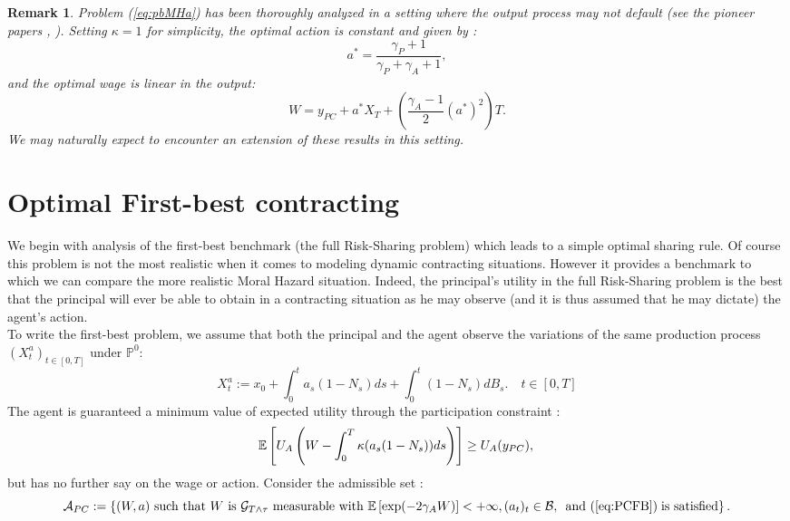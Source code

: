 \documentclass[numbook, envcountsect, envcountsame, envcountreset, runningheads, smallextended]{article}
\newtheorem{Remark}{Remark}[part]
\def \E{\mathbb{E}}
\def \P{\mathbb{P}}
\def\Bc{{\cal B}}
\begin{document}
\begin{Remark}
\label{rem:stand}
Problem (\ref{eq:pbMHa}) has been thoroughly analyzed in a setting where the output process may not default (see the pioneer papers \cite{HM}, \cite{SS} ). Setting $\kappa=1$ for simplicity,  the optimal action is  constant and given by :
$$a^* =  \frac{\gamma_P+1}{\gamma_P+\gamma_A+1},$$
and the optimal wage is linear in the output:
$$W = y_{PC} + a^* X_T+  \left( \frac{\gamma_A-1}{2} ({a^*})^2  \right)T.$$
 We may naturally expect to encounter an extension of these results in this setting.
 \end{Remark}

\section{Optimal First-best contracting}
\label{FB}

We begin with analysis of the first-best benchmark (the  full Risk-Sharing problem) which leads to a simple optimal sharing rule. Of course this problem is not the most realistic when it comes to modeling  dynamic contracting situations. However it provides a benchmark to which we can compare the more realistic Moral Hazard situation. Indeed, the principal's utility in the full Risk-Sharing problem is the best that the principal will ever be able to obtain in a contracting situation as he may observe (and it is thus assumed that he may dictate) the agent's action.\\
 
To write the first-best problem, we assume that both the principal and the agent observe the variations of the same production process $(X_t^{a})_{t \in [0,T]}$ under $\P^0$:
 \begin{equation}
 \label{eq:prodprocess1}
 X^{a}_t := x_0 + \int_0^t a_s(1-N_s) ds + \int_0^t (1-N_s) dB_s. \quad t \in [0,T]
 \end{equation}
 The agent is guaranteed a minimum value of expected utility through the participation constraint : 
\begin{equation}
\label{eq:PCFB}
\E\left[U_A\left(W-\int_0^T\kappa(a_s(1-N_s))ds\right)\right] \geq U_A(y_{PC}), \\
\end{equation}
but has no further say on the wage or action. Consider the admissible set : 
$$\mathcal{A}_{PC} := \left\{  (W,a) \hbox{ such that } W \text{ is }\mathcal{G}_{T\wedge\tau} \text{ measurable with }\E\left[\exp(-2\gamma_A W)\right] < + \infty,  (a_t)_t \in \Bc, \, \text{ and  }(\ref{eq:PCFB}) \; \text{is satisfied}\right\}. $$
\end{document}

